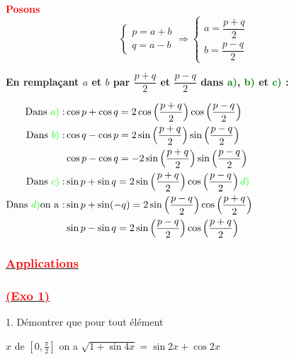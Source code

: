\documentclass[a4paper,12pt]{article}
\begin{document}
\medskip

\noindent\textbf{\textcolor{red}{Posons}} 
\[
\left\{
\begin{array}{l}
p = a + b \\
q = a - b
\end{array}
\right.
\Rightarrow
\left\{
\begin{array}{l}
a = \dfrac{p + q}{2} \\
b = \dfrac{p - q}{2}
\end{array}
\right.
\]

\noindent\textbf{En remplaçant \( a \) et \( b \) par \( \dfrac{p+q}{2} \) et \( \dfrac{p-q}{2} \) dans \textcolor{green}{a)}, \textcolor{green}{b)} et \textcolor{green}{c)} :}

\medskip

\(
\begin{aligned}
    \text{Dans } \textcolor{green}{a)}:& 
\cos p + \cos q = 2 \cos\left( \dfrac{p+q}{2} \right) \cos\left( \dfrac{p-q}{2} \right)\\
\text{Dans } \textcolor{green}{b)}:& \cos q - \cos p = 2 \sin\left( \dfrac{p+q}{2} \right) \sin\left( \dfrac{p-q}{2} \right)\\
&\cos p - \cos q = -2 \sin\left( \dfrac{p+q}{2} \right) \sin\left( \dfrac{p-q}{2} \right)\\
\text{Dans } \textcolor{green}{c)}:& 
 \sin p + \sin q = 2 \sin\left( \dfrac{p+q}{2} \right) \cos\left( \dfrac{p-q}{2} \right) \textcolor{green}{d)}\\
\text{Dans } \textcolor{green}{ d)} \text{on a :}&
\sin p + \sin(-q) = 2 \sin\left( \dfrac{p-q}{2} \right) \cos\left( \dfrac{p+q}{2} \right)\\
&\sin p - \sin q = 2 \sin\left( \dfrac{p - q}{2} \right) \cos\left( \dfrac{p + q}{2} \right)
\end{aligned}
\)

\subsubsection*{\underline{\textcolor{red}{Applications}}}

\noindent
\subsubsection*{\underline{\textcolor{red}{ (Exo 1)}}}

1. Démontrer que pour tout élément

$x$ de $\left[0, \frac{\pi}{2}\right]$ on a $\sqrt{1 + \sin 4x} = \sin 2x + \cos 2x$\\
\end{document}
